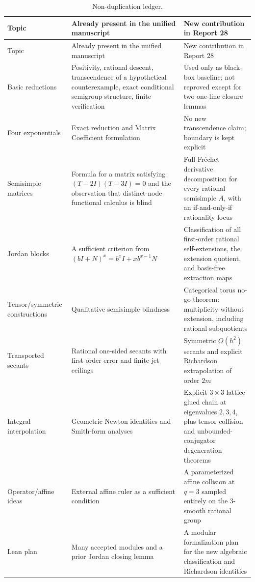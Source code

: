 \documentclass[11pt,oneside]{article}
\theoremstyle{definition}
\theoremstyle{remark}
\begin{document}
\begin{longtable}{>{\raggedright\arraybackslash}p{}
                  >{\raggedright\arraybackslash}p{}
                  >{\raggedright\arraybackslash}p{}}
\caption{Non-duplication ledger.}\label{tab:ledger}\\
\toprule
Topic & Already present in the unified manuscript & New contribution in Report 28 \\
\midrule
\endfirsthead
\toprule
Topic & Already present in the unified manuscript & New contribution in Report 28 \\
\midrule
\endhead
Basic reductions & Positivity, rational descent, transcendence of a hypothetical
counterexample, exact conditional semigroup structure, finite verification & Used only as
black-box baseline; not reproved except for two one-line closure lemmas \\
\addlinespace
Four exponentials & Exact reduction and Matrix Coefficient formulation & No new transcendence
claim; boundary is kept explicit \\
\addlinespace
Semisimple matrices & Formula for a matrix satisfying $(T-2I)(T-3I)=0$ and the observation that
distinct-node functional calculus is blind & Full Fr\'echet derivative decomposition for every
rational semisimple $A$, with an if-and-only-if rationality locus \\
\addlinespace
Jordan blocks & A sufficient criterion from $(bI+N)^x=b^xI+xb^{x-1}N$ & Classification of all
first-order rational self-extensions, the extension quotient, and basis-free extraction maps \\
\addlinespace
Tensor/symmetric constructions & Qualitative semisimple blindness & Categorical torus
no-go theorem: multiplicity without extension, including rational subquotients \\
\addlinespace
Transported secants & Rational one-sided secants with first-order error and finite-jet ceilings &
Symmetric $O(h^2)$ secants and explicit Richardson extrapolation of order $2m$ \\
\addlinespace
Integral interpolation & Geometric Newton identities and Smith-form analyses & Explicit
$3\times3$ lattice-glued chain at eigenvalues $2,3,4$, plus tensor collision and
unbounded-conjugator degeneration theorems \\
\addlinespace
Operator/affine ideas & External affine ruler as a sufficient condition & A parameterized affine
collision at $q=3$ sampled entirely on the $3$-smooth rational group \\
\addlinespace
Lean plan & Many accepted modules and a prior Jordan closing lemma & A modular formalization
plan for the new algebraic classification and Richardson identities \\
\bottomrule
\end{longtable}
\end{document}
